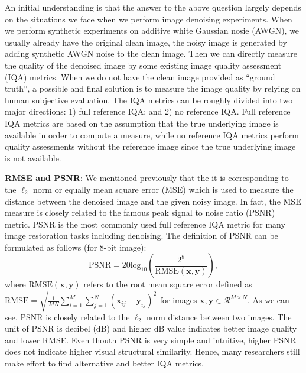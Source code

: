 An initial understanding is that the answer to the above question largely depends on the situations we face when we perform image denoising experiments. When we perform synthetic experiments on additive white Gaussian nosie (AWGN), we usually already have the original clean image, the noisy image is generated by adding synthetic AWGN noise to the clean image. Then we can directly measure the quality of the denoised image by some existing image quality assessment (IQA) metrics. When we do not have the clean image provided as ``ground truth'', a possible and final solution is to measure the image quality by relying on human subjective evaluation. The IQA metrics can be roughly divided into two major directions: 1) full reference IQA; and 2) no reference IQA. Full reference IQA metrics are based on the assumption that the true underlying image is available in order to compute a measure, while no reference IQA metrics perform quality assessments without the reference image since the true underlying image is not available. 

\textbf{RMSE and PSNR}: We mentioned previously that the it is corresponding to the $\ell_{2}$ norm or equally mean square error (MSE) which is used to measure the distance between the denoised image and the given noisy image. In fact, the MSE measure is closely related to the famous peak signal to noise ratio (PSNR) metric. PSNR is the most commonly used full reference IQA metric for many image restoration tasks including denoising. The definition of PSNR can be formulated as follows (for 8-bit image):
\begin{equation}
\text{PSNR}
=
20\text{log}_{10}
(\frac{2^{8}}{\text{RMSE}(\bm{x},\bm{y})}),
\end{equation}
where $\text{RMSE}(\bm{x},\bm{y})$ refers to the root mean square error defined as $\text{RMSE}=\sqrt{\frac{1}{MN}\sum_{i=1}^{M}\sum_{j=1}^{N}(\bm{x}_{ij}-\bm{y}_{ij})^{2}}$ for images $\bm{x},\bm{y}\in\mathcal{R}^{M\times N}$. As we can see, PSNR is closely related to the $\ell_{2}$ norm distance between two images. The unit of PSNR is decibel (dB) and higher dB value indicates better image quality and lower RMSE. Even thouth PSNR is very simple and intuitive, higher PSNR does not indicate higher visual structural similarity. Hence, many researchers still make effort to find alternative and better IQA metrics.

